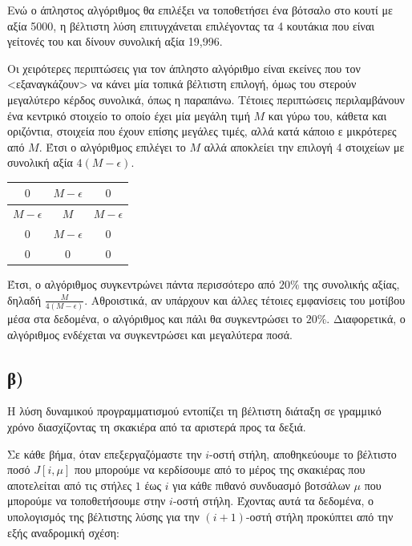 \documentclass[11pt,a4paper]{book}
\begin{document}
Ενώ ο άπληστος αλγόριθμος θα επιλέξει να τοποθετήσει ένα βότσαλο
στο κουτί με αξία 5000, η βέλτιστη λύση επιτυγχάνεται επιλέγοντας
τα 4 κουτάκια που είναι γείτονές του και δίνουν συνολική αξία 19,996.

Οι χειρότερες περιπτώσεις για τον άπληστο αλγόριθμο είναι εκείνες που τον <εξαναγκάζουν> να κάνει μία τοπικά βέλτιστη επιλογή, όμως του στερούν μεγαλύτερο κέρδος συνολικά, όπως η παραπάνω. Τέτοιες περιπτώσεις περιλαμβάνουν ένα κεντρικό στοιχείο το οποίο έχει μία μεγάλη τιμή $M$ και γύρω του, κάθετα και οριζόντια, στοιχεία που έχουν επίσης μεγάλες τιμές, αλλά κατά κάποιο ε μικρότερες από $M$. Έτσι ο αλγόριθμος επιλέγει το $M$ αλλά αποκλείει την επιλογή 4 στοιχείων με συνολική αξία $4(M - \epsilon)$.

\vspace{3mm}
\begin{doublespace}
\begin{tabular}{|c|c|c|}
	\hline
	$0$            & $M - \epsilon$ & $0$            \\ \hline
	$M - \epsilon$ & $M$            & $M - \epsilon$ \\ \hline
	$0$            & $M - \epsilon$ & $0$            \\ \hline
	$0$            & $0$            & $0$            \\ \hline
\end{tabular}
\end{doublespace}
\vspace{3mm}

Έτσι, ο αλγόριθμος συγκεντρώνει πάντα περισσότερο από $20\%$ της συνολικής αξίας, δηλαδή $\frac{M}{4(M - \epsilon)}$. Αθροιστικά, αν υπάρχουν και άλλες τέτοιες εμφανίσεις του μοτίβου μέσα στα δεδομένα, ο αλγόριθμος και πάλι θα συγκεντρώσει το $20\%$. Διαφορετικά, ο αλγόριθμος ενδέχεται να συγκεντρώσει και μεγαλύτερα ποσά.

\subsection*{β)}
Η λύση δυναμικού προγραμματισμού εντοπίζει τη βέλτιστη διάταξη σε γραμμικό χρόνο διασχίζοντας τη σκακιέρα από τα αριστερά προς τα δεξιά.

Σε κάθε βήμα, όταν επεξεργαζόμαστε την $i$-οστή στήλη, αποθηκεύουμε το βέλτιστο ποσό $J[ i, \mu ]$ που μπορούμε να κερδίσουμε από το μέρος της σκακιέρας που αποτελείται από τις στήλες $1$ έως $i$ για κάθε πιθανό συνδυασμό βοτσάλων $\mu$ που μπορούμε να τοποθετήσουμε στην $i$-οστή στήλη. Έχοντας αυτά τα δεδομένα, ο υπολογισμός της βέλτιστης λύσης για την $(i + 1)$-οστή στήλη προκύπτει από την εξής αναδρομική σχέση:
\end{document}
